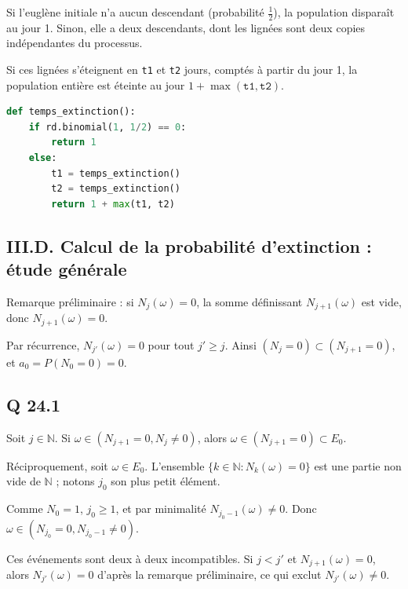 \documentclass[11pt,a4paper]{article}
\newcommand{\equationajustee}[1]{%
  \sbox{\boiteequation}{$\displaystyle #1$}%
  \ifdim\wd\boiteequation>\linewidth
    \[\resizebox{\linewidth}{!}{\usebox{\boiteequation}}\]%
  \else
    \[#1\]%
  \fi}
\begin{document}
Si l'euglène initiale n'a aucun descendant (probabilité \(\frac12\)), la population disparaît au jour 1. Sinon, elle a deux descendants, dont les lignées sont deux copies indépendantes du processus.

Si ces lignées s'éteignent en \texttt{t1} et \texttt{t2} jours, comptés à partir du jour 1, la population entière est éteinte au jour \(1+\max(\texttt{t1},\texttt{t2})\).

\begin{lstlisting}[language=Python]
def temps_extinction():
    if rd.binomial(1, 1/2) == 0:
        return 1
    else:
        t1 = temps_extinction()
        t2 = temps_extinction()
        return 1 + max(t1, t2)
\end{lstlisting}

\hypertarget{iii.d.-calcul-de-la-probabilituxe9-dextinction-uxe9tude-guxe9nuxe9rale}{%
\subsection{III.D. Calcul de la probabilité d'extinction : étude générale}\label{iii.d.-calcul-de-la-probabilituxe9-dextinction-uxe9tude-guxe9nuxe9rale}}

Remarque préliminaire : si \(N_j(\omega)=0\), la somme définissant \(N_{j+1}(\omega)\) est vide, donc \(N_{j+1}(\omega)=0\).

Par récurrence, \(N_{j'}(\omega)=0\) pour tout \(j'\ge j\). Ainsi \((N_j=0)\subset(N_{j+1}=0)\), et \(a_0=P(N_0=0)=0\).

\hypertarget{q-24.1}{%
\subsection{Q 24.1}\label{q-24.1}}

Soit \(j\in\mathbb N\). Si \(\omega\in(N_{j+1}=0,N_j\ne0)\), alors \(\omega\in(N_{j+1}=0)\subset E_0\).

Réciproquement, soit \(\omega\in E_0\). L'ensemble \(\{k\in\mathbb N:N_k(\omega)=0\}\)
est une partie non vide de \(\mathbb N\) ; notons \(j_0\) son plus petit élément.

Comme \(N_0=1\), \(j_0\ge1\), et par minimalité \(N_{j_0-1}(\omega)\neq0\). Donc \(\omega\in(N_{j_0}=0,N_{j_0-1}\ne0)\).

\equationajustee{\boxed{E_0=\bigcup_{j\in\mathbb N}(N_{j+1}=0,\ N_j\ne0)}}

Ces événements sont deux à deux incompatibles. Si \(j<j'\) et \(N_{j+1}(\omega)=0\), alors \(N_{j'}(\omega)=0\) d'après la remarque préliminaire, ce qui exclut \(N_{j'}(\omega)\ne0\).
\end{document}

